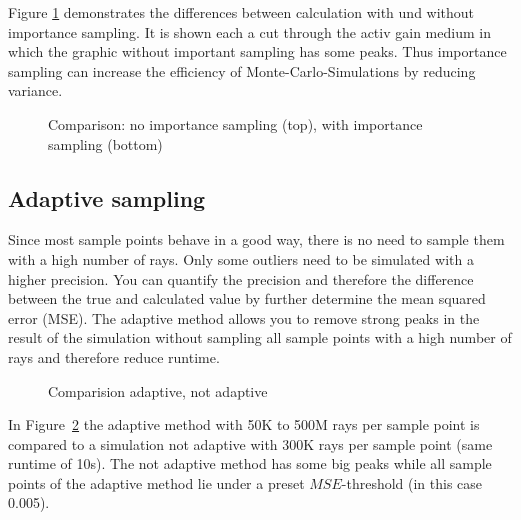 Figure \ref{graphic:importance} demonstrates
the differences between calculation with und without
importance sampling. It is shown each a cut through the activ 
gain medium in which the graphic without important
sampling has some peaks. Thus importance 
sampling can increase the efficiency of Monte-Carlo-Simulations 
by reducing variance.
\begin{figure}[H]
  \centerline
  {}
  \caption{Comparison: no importance sampling (top), with importance sampling (bottom)}
  \label{graphic:importance}
\end{figure}

\subsection{Adaptive sampling}
Since most sample points behave in a good way, there is no need
to sample them with a high number of rays. Only some outliers need to
be simulated with a higher precision. You can quantify the precision
and therefore the difference between the true and calculated value by
further determine the mean squared error (MSE).
The adaptive method allows you to remove strong peaks in the result
of the simulation without sampling all sample points with
a high number of rays and therefore reduce runtime.
\begin{figure}[H]
  \centerline{
    }
  \caption{Comparision adaptive, not adaptive}
  \label{plot:adaptive}
\end{figure}
In Figure~\ref{plot:adaptive} the adaptive method with 
50K to 500M rays per sample point is compared to a simulation 
not adaptive with 300K rays per sample point (same runtime of 10s).
The not adaptive method has some big peaks while all sample points of 
the adaptive method lie under a preset $MSE$-threshold (in this case 0.005). 

